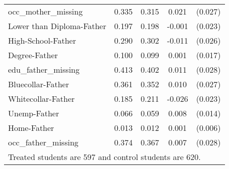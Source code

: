\begin{table}[htbp]
\begin{tabular}{l*{1}{cccc}}
occ\_mother\_missing  &       0.335&       0.315&       0.021         &     (0.027)\\
Lower than Diploma-Father&       0.197&       0.198&      -0.001         &     (0.023)\\
High-School-Father  &       0.290&       0.302&      -0.011         &     (0.026)\\
Degree-Father       &       0.100&       0.099&       0.001         &     (0.017)\\
edu\_father\_missing  &       0.413&       0.402&       0.011         &     (0.028)\\
Bluecollar-Father   &       0.361&       0.352&       0.010         &     (0.027)\\
Whitecollar-Father  &       0.185&       0.211&      -0.026         &     (0.023)\\
Unemp-Father        &       0.066&       0.059&       0.008         &     (0.014)\\
Home-Father         &       0.013&       0.012&       0.001         &     (0.006)\\
occ\_father\_missing  &       0.374&       0.367&       0.007         &     (0.028)\\
\hline\hline
\multicolumn{5}{l}{\footnotesize Treated students are 597 and control students are 620.}\\
\end{tabular}
\end{table}
